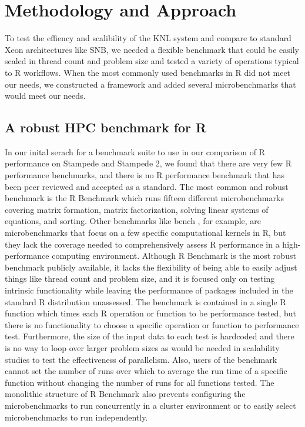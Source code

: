 \section{Methodology and Approach}\label{sec:methodology}

To test the effiency and scalibility of the KNL system and compare to standard Xeon
architectures like SNB, we needed a flexible benchmark that could be easily scaled in
thread count and problem size and tested a variety of operations typical to R workflows.
When the most commonly used benchmarks in R did not meet our needs, we constructed a
framework and added several microbenchmarks that would meet our needs.

\subsection{A robust HPC benchmark for R} \label{sec:hpcBenchmark}

In our inital serach for a benchmark suite to use in our comparison of R performance on
Stampede and Stampede 2, we found that there are very few R performance benchmarks, and
there is no R performance benchmark that has been peer reviewed and accepted as a
standard. The most common and robust benchmark is the R Benchmark
\cite{urbanek:Rbenchmarks} which runs fifteen different microbenchmarks covering matrix
formation, matrix factorization, solving linear systems of equations, and sorting. Other
benchmarks like bench \cite{urbanek:Rbenchmarks}, for example, are microbenchmarks that
focus on a few specific computational kernels in R, but they lack the coverage needed to
comprehensively assess R performance in a high-performance computing environment. Although
R Benchmark is the most robust benchmark publicly available, it lacks the flexibility of
being able to easily adjust things like thread count and problem size, and it is focused
only on testing intrinsic functionality while leaving the performance of packages included
in the standard R distribution unassessed.  The benchmark is contained in a single R
function which times each R operation or function to be performance tested, but there is
no functionality to choose a specific operation or function to performance test.
Furthermore, the size of the input data to each test is hardcoded and there is no way to
loop over larger problem sizes as would be needed in scalability studies to test the
effectiveness of parallelism. Also, users of the benchmark cannot set the number of runs
over which to average the run time of a specific function without changing the number of
runs for all functions tested. The monolithic structure of R Benchmark also prevents
configuring the microbenchmarks to run concurrently in a cluster environment or to easily
select microbenchmarks to run independently.


